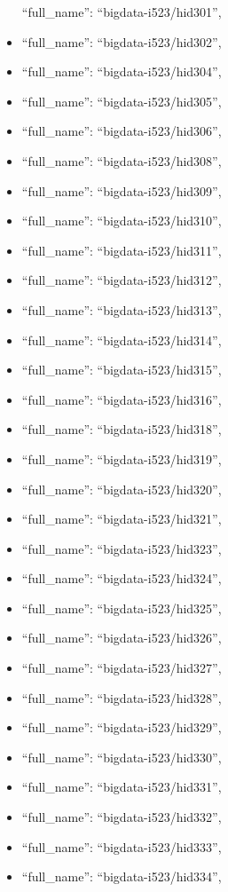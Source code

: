 \begin{itemize}
  ``full\_name'': ``bigdata-i523/hid301'',
\item
  ``full\_name'': ``bigdata-i523/hid302'',
\item
  ``full\_name'': ``bigdata-i523/hid304'',
\item
  ``full\_name'': ``bigdata-i523/hid305'',
\item
  ``full\_name'': ``bigdata-i523/hid306'',
\item
  ``full\_name'': ``bigdata-i523/hid308'',
\item
  ``full\_name'': ``bigdata-i523/hid309'',
\item
  ``full\_name'': ``bigdata-i523/hid310'',
\item
  ``full\_name'': ``bigdata-i523/hid311'',
\item
  ``full\_name'': ``bigdata-i523/hid312'',
\item
  ``full\_name'': ``bigdata-i523/hid313'',
\item
  ``full\_name'': ``bigdata-i523/hid314'',
\item
  ``full\_name'': ``bigdata-i523/hid315'',
\item
  ``full\_name'': ``bigdata-i523/hid316'',
\item
  ``full\_name'': ``bigdata-i523/hid318'',
\item
  ``full\_name'': ``bigdata-i523/hid319'',
\item
  ``full\_name'': ``bigdata-i523/hid320'',
\item
  ``full\_name'': ``bigdata-i523/hid321'',
\item
  ``full\_name'': ``bigdata-i523/hid323'',
\item
  ``full\_name'': ``bigdata-i523/hid324'',
\item
  ``full\_name'': ``bigdata-i523/hid325'',
\item
  ``full\_name'': ``bigdata-i523/hid326'',
\item
  ``full\_name'': ``bigdata-i523/hid327'',
\item
  ``full\_name'': ``bigdata-i523/hid328'',
\item
  ``full\_name'': ``bigdata-i523/hid329'',
\item
  ``full\_name'': ``bigdata-i523/hid330'',
\item
  ``full\_name'': ``bigdata-i523/hid331'',
\item
  ``full\_name'': ``bigdata-i523/hid332'',
\item
  ``full\_name'': ``bigdata-i523/hid333'',
\item
  ``full\_name'': ``bigdata-i523/hid334'',

\end{itemize}
